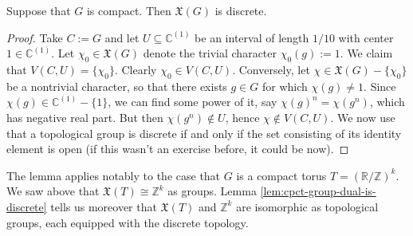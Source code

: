 \documentclass[reqno]{amsart} 
\begin{document}
\begin{lemma}\label{lem:cpct-group-dual-is-discrete}
  Suppose that $G$ is compact.  Then $\mathfrak{X}(G)$ is discrete.
\end{lemma}
\begin{proof}
  Take $C := G$ and let $U \subseteq \mathbb{C}^{(1)}$ be an interval of length $1/10$ with center $1 \in \mathbb{C}^{(1)}$.  Let $\chi_0 \in \mathfrak{X}(G)$ denote the trivial character $\chi_0(g) := 1$.  We claim that $V(C,U) = \{\chi_0\}$.  Clearly $\chi_0 \in V(C,U)$.  Conversely, let $\chi \in \mathfrak{X}(G) - \{\chi_0\}$ be a nontrivial character, so that there exists $g \in G$ for which $\chi(g) \neq 1$.  Since $\chi(g) \in \mathbb{C}^{(1)} - \{1\}$, we can find some power of it, say $\chi(g)^n = \chi(g^n)$, which has negative real part.  But then $\chi(g^n) \notin U$, hence $\chi \notin V(C,U)$.  We now use that a topological group is discrete if and only if the set consisting of its identity element is open (if this wasn't an exercise before, it could be now).
\end{proof}

The lemma applies notably to the case that $G$ is a compact torus $T = (\mathbb{R}/\mathbb{Z})^k$.  We saw above that $\mathfrak{X}(T) \cong \mathbb{Z}^k$ as groups.  Lemma \ref{lem:cpct-group-dual-is-discrete} tells us moreover that $\mathfrak{X}(T)$ and $\mathbb{Z}^k$ are isomorphic as topological groups, each equipped with the discrete topology.
\end{document}
